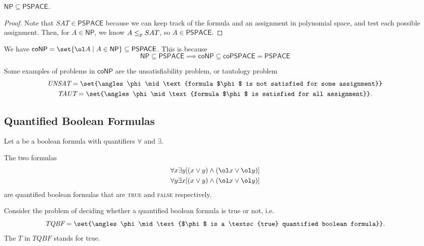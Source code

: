 \documentclass{standalone}
\begin{document}
\begin{theorem}
  \(\mathsf{NP} \subseteq \mathsf{PSPACE}\).
\end{theorem}
\begin{proof}
  Note that \(\textit{SAT} \in \mathsf{PSPACE}\) because
  we can keep track of the formula and an assignment in polynomial space,
  and test each possible assignment.
  Then, for \(A \in \mathsf{NP}\), we know \(A \mathrel{\leq_p} SAT\),
  so \(A \in \mathsf{PSPACE}\).
\end{proof}

\begin{example}
  We have \(\mathsf{coNP} = \set{\ol A \mid A \in \mathsf{NP}}
                          \subseteq \mathsf{PSPACE}\).
  This is because
  \[
    \mathsf{NP} \subseteq \mathsf{PSPACE} \implies
    \mathsf{coNP} \subseteq \mathsf{coPSPACE} = \mathsf{PSPACE}
  \]

  Some examples of problems in \(\mathsf{coNP}\)
  are the unsatisfiability problem, or tautology problem
  \begin{gather*}
    \textit{UNSAT} =
      \set{\angles \phi \mid
           \text{formula $\phi$ is not satisfied for some assignment}} \\
    \textit{TAUT} =
      \set{\angles \phi \mid
           \text{formula $\phi$ is satisfied for all assignment}}.
  \end{gather*}
\end{example}

\subsection{Quantified Boolean Formulas}
Let a  be a boolean formula
with quantifiers \(\forall\) and \(\exists\).
\begin{example}
  The two formulas
  \begin{gather*}
    \forall x \exists y [(x \lor y) \land (\ol x \lor \ol y)] \\
    \forall y \exists x [(x \lor y) \land (\ol x \lor \ol y)]
  \end{gather*}
  are quantified boolean formulas that are
  \textsc{true} and \textsc{false} respectively.
\end{example}

Consider the problem of deciding whether
a quantified boolean formula is true or not, i.e.
\[
  \textit{TQBF} =
    \set{\angles\phi \mid
         \text{$\phi$ is a \textsc{true} quantified boolean formula}}.
\]
The \(\textit{T}\) in \(\textit{TQBF}\) stands for true.
\end{document}
